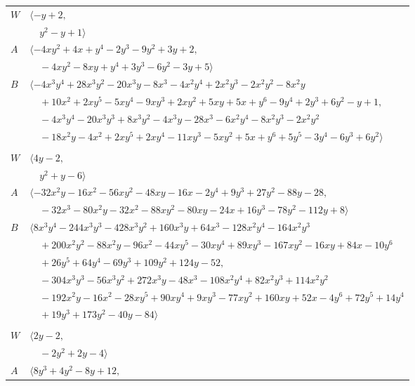 \documentclass[11pt]{article}
\begin{document}
\begin{longtable}{@{}ll@{}}
$W$ & $\langle -y+2,$\\
 & $\quad y^{2}-y+1\rangle$\\
$A$ & $\langle -4xy^{2}+4x+y^{4}-2y^{3}-9y^{2}+3y+2,$\\
 & $\quad -4xy^{2}-8xy+y^{4}+3y^{3}-6y^{2}-3y+5\rangle$\\
$B$ & $\langle -4x^{3}y^{4}+28x^{3}y^{2}-20x^{3}y-8x^{3}-4x^{2}y^{4}+2x^{2}y^{3}-2x^{2}y^{2}-8x^{2}y$\\
 & $\quad +10x^{2}+2xy^{5}-5xy^{4}-9xy^{3}+2xy^{2}+5xy+5x+y^{6}-9y^{4}+2y^{3}+6y^{2}-y+1,$\\
 & $\quad -4x^{3}y^{4}-20x^{3}y^{3}+8x^{3}y^{2}-4x^{3}y-28x^{3}-6x^{2}y^{4}-8x^{2}y^{3}-2x^{2}y^{2}$\\
 & $\quad -18x^{2}y-4x^{2}+2xy^{5}+2xy^{4}-11xy^{3}-5xy^{2}+5x+y^{6}+5y^{5}-3y^{4}-6y^{3}+6y^{2}\rangle$\\
\addlinespace[2pt]
\multicolumn{2}{@{}p{0.97\textwidth}@{}}{$i=8$, $D_i=1$, $\rho_{ij}$: $11{:}2, \allowbreak 14{:}2, \allowbreak 17{:}2, \allowbreak 19{:}1$}\\
$W$ & $\langle 4y-2,$\\
 & $\quad y^{2}+y-6\rangle$\\
$A$ & $\langle -32x^{2}y-16x^{2}-56xy^{2}-48xy-16x-2y^{4}+9y^{3}+27y^{2}-88y-28,$\\
 & $\quad -32x^{3}-80x^{2}y-32x^{2}-88xy^{2}-80xy-24x+16y^{3}-78y^{2}-112y+8\rangle$\\
$B$ & $\langle 8x^{3}y^{4}-244x^{3}y^{3}-428x^{3}y^{2}+160x^{3}y+64x^{3}-128x^{2}y^{4}-164x^{2}y^{3}$\\
 & $\quad +200x^{2}y^{2}-88x^{2}y-96x^{2}-44xy^{5}-30xy^{4}+89xy^{3}-167xy^{2}-16xy+84x-10y^{6}$\\
 & $\quad +26y^{5}+64y^{4}-69y^{3}+109y^{2}+124y-52,$\\
 & $\quad -304x^{3}y^{3}-56x^{3}y^{2}+272x^{3}y-48x^{3}-108x^{2}y^{4}+82x^{2}y^{3}+114x^{2}y^{2}$\\
 & $\quad -192x^{2}y-16x^{2}-28xy^{5}+90xy^{4}+9xy^{3}-77xy^{2}+160xy+52x-4y^{6}+72y^{5}+14y^{4}$\\
 & $\quad +19y^{3}+173y^{2}-40y-84\rangle$\\
\addlinespace[2pt]
\multicolumn{2}{@{}p{0.97\textwidth}@{}}{$i=9$, $D_i=1$, $\rho_{ij}$: $12{:}1, \allowbreak 14{:}1, \allowbreak 15{:}2, \allowbreak 17{:}1$}\\
$W$ & $\langle 2y-2,$\\
 & $\quad -2y^{2}+2y-4\rangle$\\
$A$ & $\langle 8y^{3}+4y^{2}-8y+12,$\\

\end{longtable}
\end{document}
